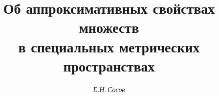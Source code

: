 




%


\newcommand{\Fr}{\operatorname{Fr}}


\newcommand{\diam}{\operatorname{diam}}


 




 


\setcounter{page}{81} 















\author{\it Е.Н.\,Сосов} 


\title{Об аппроксимативных свойствах множеств \\


в специальных метрических пространствах} 


 


\date{} 




\pagestyle{plain} %


 




\maketitle 


\label{begin} 





